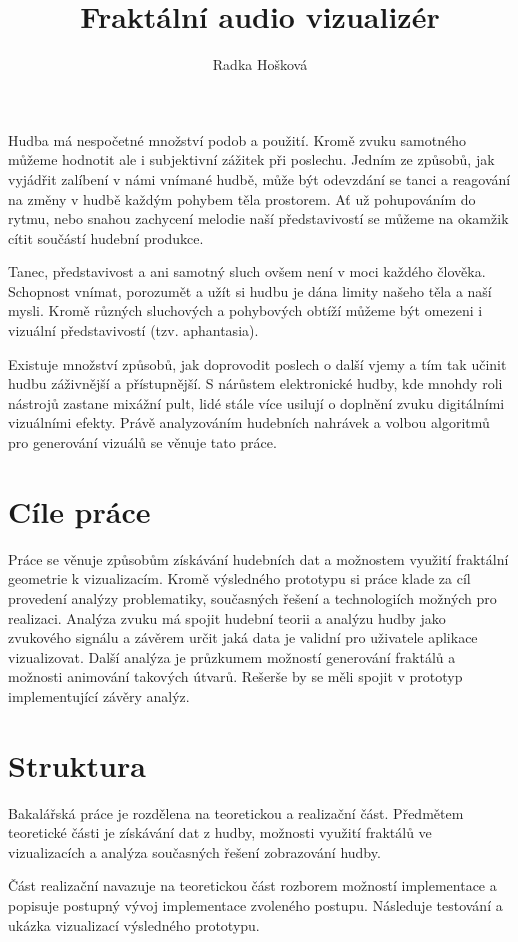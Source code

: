\documentclass[thesis=B, czech]{FITthesis}[2019/03/06]
\title{Fraktální audio vizualizér}
\author{Radka Hošková} %
\begin{document}
\begin{introduction}

Hudba má nespočetné množství podob a použití. Kromě zvuku samotného můžeme hodnotit ale i subjektivní zážitek při poslechu. Jedním ze způsobů, jak vyjádřit zalíbení v námi vnímané hudbě, může být odevzdání se tanci a reagování na změny v hudbě každým pohybem těla prostorem. Ať už pohupováním do rytmu, nebo snahou zachycení melodie naší představivostí se můžeme na okamžik cítit součástí hudební produkce.

Tanec, představivost a ani samotný sluch ovšem není v moci každého člověka. Schopnost vnímat, porozumět a užít si hudbu je dána limity našeho těla a naší mysli. Kromě různých sluchových a pohybových obtíží můžeme být omezeni i vizuální představivostí (tzv. aphantasia).

Existuje množství způsobů, jak doprovodit poslech o další vjemy a tím tak učinit hudbu záživnější a přístupnější. S nárůstem elektronické hudby, kde mnohdy roli nástrojů zastane mixážní pult, lidé stále více usilují o doplnění zvuku digitálními vizuálními efekty. Právě analyzováním hudebních nahrávek a volbou algoritmů pro generování vizuálů se věnuje tato práce.

\newpage

\section*{Cíle práce}

Práce se věnuje způsobům získávání hudebních dat a možnostem využití fraktální geometrie k vizualizacím. Kromě výsledného prototypu si práce klade za cíl provedení analýzy problematiky, současných řešení a technologiích možných pro realizaci. Analýza zvuku má spojit hudební teorii a analýzu hudby jako zvukového signálu a závěrem určit jaká data je validní pro uživatele aplikace vizualizovat. Další analýza je průzkumem možností generování fraktálů a možnosti animování takových útvarů. Rešerše by se měli spojit v prototyp implementující závěry analýz.


\section*{Struktura}

Bakalářská práce je rozdělena na teoretickou a realizační část. Předmětem teoretické části je získávání dat z hudby, možnosti využití fraktálů ve vizualizacích a analýza současných řešení zobrazování hudby.

Část realizační navazuje na teoretickou část rozborem možností implementace a popisuje postupný vývoj implementace zvoleného postupu. Následuje testování a ukázka vizualizací výsledného prototypu.

\end{introduction}
\end{document}
